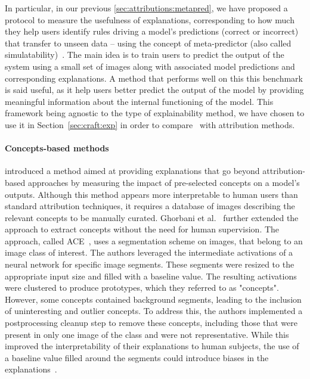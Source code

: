 In particular, in our previous \autoref{sec:attributions:metapred}, we have proposed a protocol to measure the usefulness of explanations, corresponding to how much they help users identify rules driving a model's predictions (correct or incorrect) that transfer to unseen data -- using the concept of meta-predictor (also called simulatability)~\cite{kim2016examples,doshivelez2017rigorous,fong2017meaningful}. 
The main idea is to train users to predict the output of the system using a small set of images along with associated model predictions and corresponding explanations. 
A method that performs well on this this benchmark is said useful, as it help users better predict the output of the model by providing meaningful information about the internal functioning of the model.
This framework being agnostic to the type of explainability method, we have chosen to use it in Section~\ref{sec:craft:exp} in order to compare \craft~with attribution methods.




\paragraph{Concepts-based methods}
\cite{kim2018interpretability} introduced a method aimed at providing explanations that go beyond attribution-based approaches by measuring the impact of pre-selected concepts on a model's outputs. Although this method appears more interpretable to human users than standard attribution techniques, it requires a database of images describing the relevant concepts to be manually curated.
Ghorbani et al.~\cite{ghorbani2019towards} further extended the approach to extract concepts  without the need for human supervision. The approach, called ACE~\cite{ghorbani2019towards}, uses a segmentation scheme on images, that belong to an image class of interest. %
The authors leveraged the intermediate activations of a neural network for specific image segments. These segments were resized to the appropriate input size and filled with a baseline value. The resulting activations were clustered to produce prototypes, which they referred to as "concepts". However, some concepts contained background segments, leading to the inclusion of uninteresting and outlier concepts. To address this, the authors implemented a postprocessing cleanup step to remove these concepts, including those that were present in only one image of the class and were not representative. While this improved the interpretability of their explanations to human subjects, the use of a baseline value filled around the segments could introduce biases in the explanations~\cite{hsieh2020evaluations,sturmfels2020visualizing,haug2021baselines,kindermans2019reliability}.

